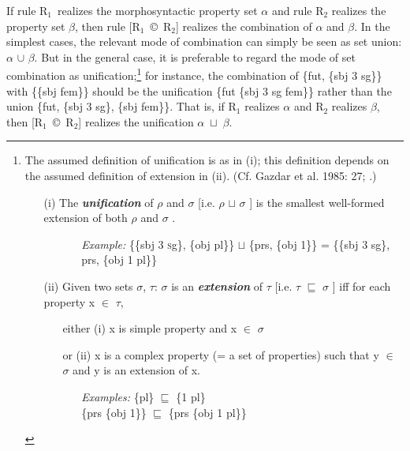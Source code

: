 \documentclass[output=paper,
modfonts
]{LSP/langsci}
\begin{document}
If rule R$_{1}$~realizes the morphosyntactic property set $\alpha $ and rule R$_{2}$ realizes the property set $\beta $, then rule [R$_{1}$~©~R$_{2}$] realizes the combination of $\alpha $ and $\beta $.  In the simplest cases, the relevant mode of combination can simply be seen as set union:  $\alpha $ ${\cup}$ $\beta $.  But in the general case, it is preferable to regard the mode of set combination as unification;\footnote{The assumed definition of unification is as in (i); this definition depends on the assumed definition of extension in (ii).  (Cf. Gazdar et al. 1985: 27; \citealt[41]{Stump2001}.)
\begin{itemize}
\item[(i)] The \textbf{\textit{unification}} of $\rho $ and $\sigma $ [i.e. $\rho $ ${\sqcup}$ $\sigma $ ] is the smallest well\nobreakdash-formed extension of both $\rho $ and $\sigma $ .
	\begin{itemize}
	\item[]
		\begin{itemize}
		\item[\textit{Example:}] \{\textsc{\{}sbj \textsc{3 s}g\textsc{\}, \{}obj pl\}\} ${\sqcup}$ \{prs, \textsc{\{}obj 1\}\} = \{\{sbj 3 sg\}, prs, \{obj 1 pl\}\} 
		\end{itemize}
	\end{itemize}
\item[(ii)] Given two sets $\sigma $, $\tau $:  $\sigma $ is an \textbf{\textit{extension}} of $\tau $ [i.e. $\tau $ ${\sqsubseteq}$ $\sigma $ ] iff for each property x ${\in}$ $\tau $, 
	\begin{itemize}
	\item[either (i)]   x is simple property and x ${\in}$ $\sigma$ 
	\item[or (ii)] x is a complex property (= a set of properties) such that y ${\in}$ $\sigma $ and y is an extension of x. 
		\begin{itemize}
		\item[\textit{Examples:}] \{pl\} ${\sqsubseteq}$ \{1 pl\} \\ \{prs \{obj 1\}\} ${\sqsubseteq}$ \{prs \{obj 1 pl\}\}
		\end{itemize}
	\end{itemize}
\end{itemize}}
for instance, the combination of \{fut, \{sbj 3 sg\}\} with \{\{sbj fem\}\} should be the unification \{fut \{sbj 3 sg fem\}\} rather than the union \{fut, \{sbj 3 sg\}, \{sbj fem\}\}.  That is, if R$_{1}$ realizes $\alpha $ and R$_{2}$ realizes $\beta $, then [R$_{1}$~©~R$_{2}$] realizes the unification $\alpha $~${\sqcup}$~$\beta $.
\end{document}
